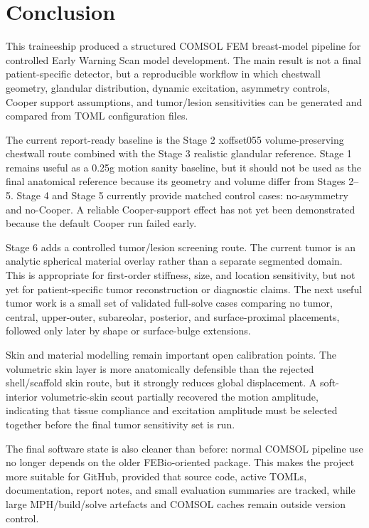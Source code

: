 \section{Conclusion}

This traineeship produced a structured COMSOL FEM breast-model pipeline for controlled Early Warning Scan model development. The main result is not a final patient-specific detector, but a reproducible workflow in which chestwall geometry, glandular distribution, dynamic excitation, asymmetry controls, Cooper support assumptions, and tumor/lesion sensitivities can be generated and compared from TOML configuration files.

The current report-ready baseline is the Stage 2 xoffset055 volume-preserving chestwall route combined with the Stage 3 realistic glandular reference. Stage 1 remains useful as a 0.25g motion sanity baseline, but it should not be used as the final anatomical reference because its geometry and volume differ from Stages 2--5. Stage 4 and Stage 5 currently provide matched control cases: no-asymmetry and no-Cooper. A reliable Cooper-support effect has not yet been demonstrated because the default Cooper run failed early.

Stage 6 adds a controlled tumor/lesion screening route. The current tumor is an analytic spherical material overlay rather than a separate segmented domain. This is appropriate for first-order stiffness, size, and location sensitivity, but not yet for patient-specific tumor reconstruction or diagnostic claims. The next useful tumor work is a small set of validated full-solve cases comparing no tumor, central, upper-outer, subareolar, posterior, and surface-proximal placements, followed only later by shape or surface-bulge extensions.

Skin and material modelling remain important open calibration points. The volumetric skin layer is more anatomically defensible than the rejected shell/scaffold skin route, but it strongly reduces global displacement. A soft-interior volumetric-skin scout partially recovered the motion amplitude, indicating that tissue compliance and excitation amplitude must be selected together before the final tumor sensitivity set is run.

The final software state is also cleaner than before: normal COMSOL pipeline use no longer depends on the older FEBio-oriented package. This makes the project more suitable for GitHub, provided that source code, active TOMLs, documentation, report notes, and small evaluation summaries are tracked, while large MPH/build/solve artefacts and COMSOL caches remain outside version control.
